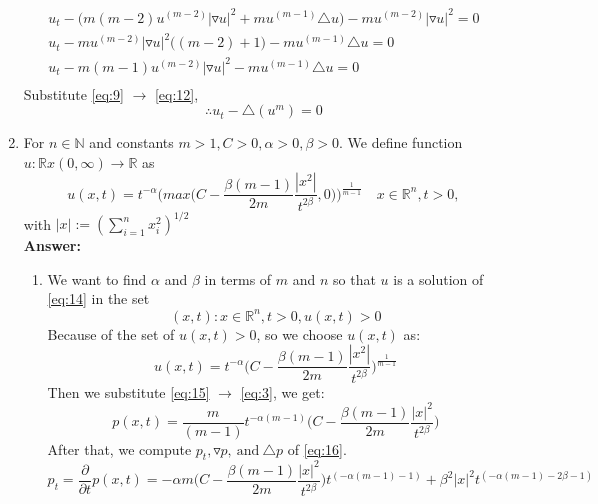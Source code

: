 \documentclass[a4paper,9pt]{article}
\newcommand{\R}{\mathbb{R}}
\newcommand{\N}{\mathbb{N}}
\begin{document}
\begin{enumerate}
\begin{equation}
\begin{aligned}
	u_t - \bigg( m(m-2)u^{(m-2)} |\triangledown u|^2 + mu^{(m-1)} \triangle u \bigg) - m u^{(m-2)} |\triangledown u|^2 = 0\\
	u_t - m u^{(m-2)} |\triangledown u|^2\bigg( (m-2) + 1 \bigg) - mu^{(m-1)} \triangle u = 0\\
	u_t - m(m-1) u^{(m-2)} |\triangledown u|^2 - mu^{(m-1)} \triangle u = 0\\
	\end{aligned}
	\end{equation}
	Substitute \eqref{eq:9} $\rightarrow$ \eqref{eq:12},
	\begin{equation}
	\therefore u_t - \triangle (u^m) = 0
	\end{equation}
	\newpage
	\item For $n \in \N$ and constants $m>1,C>0,\alpha >0, \beta > 0$. We define function $u:\R x (0,\infty)\rightarrow \R$ as
	\begin{equation}\label{eq:14}
	u(x,t) = t^{-\alpha} \bigg( max\bigg( C - \frac{\beta(m-1)}{2m} \frac{|x^2|}{t^{2\beta}},0 \bigg) \bigg)^\frac{1}{m-1} \quad x \in \R^n, t>0,
	\end{equation}
	with $|x|:= (\sum_{i=1}^{n}x_i^2)^{1/2}$\\
	\newline
	\textbf{Answer:}
	\begin{enumerate}
		\item We want to find $\alpha$ and $\beta$ in terms of $m$ and $n$ so that $u$ is a solution of \eqref{eq:14} in the set $${(x,t): x \in \R^n, t>0, u(x,t)>0}$$
		Because of the set of $u(x,t) > 0$, so we choose $u(x,t)$ as:
		\begin{equation}\label{eq:15}
		u(x,t) = t^{-\alpha} \bigg( C - \frac{\beta(m-1)}{2m} \frac{|x^2|}{t^{2\beta}} \bigg)^\frac{1}{m-1}
		\end{equation}
		Then we substitute \eqref{eq:15} $\rightarrow$ \eqref{eq:3}, we get:
		\begin{equation}\label{eq:16}
		p(x,t) = \frac{m}{(m-1)} t^{-\alpha(m-1)} \bigg(C- \frac{\beta(m-1)}{2m}\frac{|x|^2}{t^{2\beta}}\bigg)
		\end{equation}
		After that, we compute $p_t,\triangledown p,\ \text{and}\ \triangle p$ of \eqref{eq:16}.
		\begin{equation}\label{eq:17}
		p_t = \frac{\partial}{\partial t} p(x,t) = -\alpha m \bigg( C- \frac{\beta(m-1)}{2m}\frac{|x|^2}{t^{2\beta}} \bigg)t^{(-\alpha(m-1)-1)}  + \beta^2 |x|^2t^{(-\alpha(m-1)-2\beta-1)}
		\end{equation}
		\begin{equation}\label{eq:18}

\end{equation}
\end{enumerate}
\end{enumerate}
\end{document}
